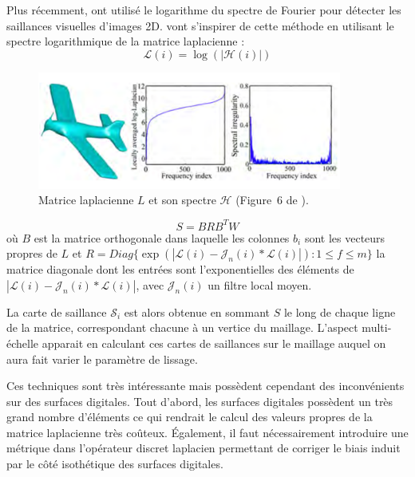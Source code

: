Plus récemment,  ont utilisé le logarithme du spectre de
Fourier pour détecter les saillances visuelles d'images 2D.  vont
s'inspirer de cette méthode en utilisant le spectre logarithmique de la matrice
laplacienne :
%
\begin{equation}
  \mathcal{L}(i) = \log(|\mathcal{H}(i)|)
\end{equation}

\begin{figure}[ht]{
    \begin{center}
    \includegraphics[width=10cm]{images/Feature/LaplacianSpectrumLogAvg}
    \end{center}}
    \caption[Matrice laplacienne et son spectre.]{Matrice laplacienne $L$ et son spectre $\mathcal{H}$ (Figure~6 de \cite{Song2014}).
      \label{fig:laplacian-spectrum-avg}}
\end{figure}


\begin{equation}
  S = BRB^TW
\end{equation}
%
où $B$ est la matrice orthogonale dans laquelle les colonnes $b_i$ sont les
vecteurs propres de $L$ et $R = Diag\{\exp(|\mathcal{L}(i) - \mathcal{J}_n(i)
\ast \mathcal{L}(i)|) : 1 \le f \le m\}$ la matrice diagonale dont les entrées
sont l'exponentielles des éléments de $|\mathcal{L}(i) - \mathcal{J}_n(i) \ast
\mathcal{L}(i)|$, avec $\mathcal{J}_n(i)$ un filtre local moyen.


La carte de saillance $\mathcal{S}_i$ est alors obtenue en sommant $S$ le long
de chaque ligne de la matrice, correspondant chacune à un vertice du maillage.
L'aspect multi-échelle apparait en calculant ces cartes de saillances sur le
maillage auquel on aura fait varier le paramètre de lissage.


Ces techniques sont très intéressante mais possèdent cependant des inconvénients
sur des surfaces digitales. Tout d'abord, les surfaces digitales possèdent un
très grand nombre d'éléments ce qui rendrait le calcul des valeurs propres de la
matrice laplacienne très coûteux. Également, il faut nécessairement introduire
une métrique dans l'opérateur discret laplacien permettant de corriger le biais
induit par le côté isothétique des surfaces digitales.


